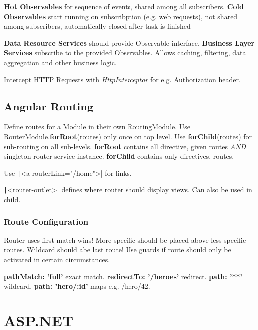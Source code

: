 \begin{multicols*}{2}
\textbf{Hot Observables} for sequence of events, shared among all subscribers.
\textbf{Cold Observables} start running on subscribption (e.g. web requests), not shared among subscribers, automatically closed after task is finished

\textbf{Data Resource Services} should provide Observable interface.
\textbf{Business Layer Services} subscribe to the provided Observables. Allows caching, filtering, data aggregation and other business logic.

Intercept HTTP Requests with \textit{HttpInterceptor} for e.g. Authorization header.

\subsection{Angular Routing}
Define routes for a Module in their own RoutingModule.
Use RouterModule.\textbf{forRoot}(routes) only once on top level. Use \textbf{forChild}(routes) for sub-routing on all sub-levels.
\textbf{forRoot} contains all directive, given routes \textit{AND} singleton router service instance. \textbf{forChild} contains only directives, routes.

Use \texttt|<a routerLink="/home">| for links.

\texttt|<router-outlet>| defines where router should display views.
Can also be used in child.

\subsubsection{Route Configuration}
Router uses first-match-wins! More specific should be placed above less specific routes. Wildcard should abe last route! Use guards if route should only be activated in certain circumstances.

\textbf{pathMatch: 'full'} exact match.
\textbf{redirectTo: '/heroes'} redirect.
\textbf{path: '**'} wildcard.
\textbf{path: 'hero/:id'} maps e.g. /hero/42.


\section{ASP.NET}

\end{multicols*}
